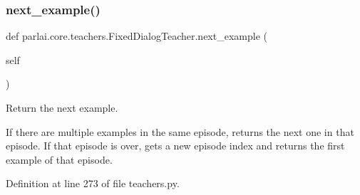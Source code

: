 \subsubsection{\texorpdfstring{next\+\_\+example()}{next\_example()}}
{\footnotesize\ttfamily def parlai.\+core.\+teachers.\+Fixed\+Dialog\+Teacher.\+next\+\_\+example (\begin{DoxyParamCaption}\item[{}]{self }\end{DoxyParamCaption})}

\begin{DoxyVerb}Return the next example.

If there are multiple examples in the same episode, returns the next one in that
episode. If that episode is over, gets a new episode index and returns the first
example of that episode.
\end{DoxyVerb}
 

Definition at line 273 of file teachers.\+py.


